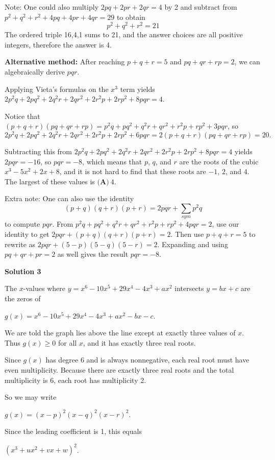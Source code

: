 \begin{enumerate}
 Note: One could also multiply $2pq+2pr+2qr = 4$ by 2 and subtract from $p^2+q^2+r^2+4pq+4pr+4qr = 29$ to obtain 
 \[p^2+q^2+r^2=21\] The ordered triple {16,4,1} sums to 21, and the answer choices are all positive integers, therefore the answer is 4. 

 \textbf{Alternative method:} After reaching $p+q+r = 5$ and $pq + qr + rp = 2$, we can algebraically derive $pqr$.

 Applying Vieta's formulas on the $x^3$ term yields $2p^2q+2pq^2+2q^2r+2qr^2+2r^2p+2rp^2+8pqr = 4$.

 Notice that $(p+q+r)(pq+qr+rp) = p^2q+pq^2+q^2r+qr^2+r^2p+rp^2+3pqr$, so 
 \[2p^2q+2pq^2+2q^2r+2qr^2+2r^2p+2rp^2+6pqr = 2(p+q+r)(pq+qr+rp) = 20.\]

 Subtracting this from $2p^2q+2pq^2+2q^2r+2qr^2+2r^2p+2rp^2+8pqr = 4$ yields $2pqr = -16$, so $pqr = -8$, which means that $p$, $q$, and $r$ are the roots of the cubic $x^3 - 5x^2 + 2x + 8$, and it is not hard to find that these roots are $-1$, $2$, and $4$. The largest of these values is $\boxed{\textbf{(A)}\ 4}$.

 Extra note: One can also use the identity
 \[(p+q)(q+r)(p+r)=2pqr+\sum_{sym}p^2q\]to compute $pqr$. From $p^2q+pq^2+q^2r+qr^2+r^2p+rp^2+4pqr = 2$, use our identity to get $2pqr+(p+q)(q+r)(p+r)=2$. Then use $p+q+r=5$ to rewrite as $2pqr+(5-p)(5-q)(5-r)=2$. Expanding and using $pq+qr+pr=2$ as well gives the result $pqr=-8$.

 



\textbf{Solution 3}

The $x$-values where $y = x^6 - 10x^5 + 29x^4 - 4x^3 + ax^2$ intersects $y = bx + c$ are the zeros of

 $g(x) = x^6 - 10x^5 + 29x^4 - 4x^3 + ax^2 - bx - c$.

 We are told the graph lies above the line except at exactly three values of $x$. Thus $g(x) \ge 0$ for all $x$, and it has exactly three real roots.

 Since $g(x)$ has degree 6 and is always nonnegative, each real root must have even multiplicity. Because there are exactly three real roots and the total multiplicity is 6, each root has multiplicity 2.

 So we may write

 $g(x) = (x-p)^2(x-q)^2(x-r)^2$.

 Since the leading coefficient is 1, this equals

 $(x^3 + ux^2 + vx + w)^2$.


\end{enumerate}
